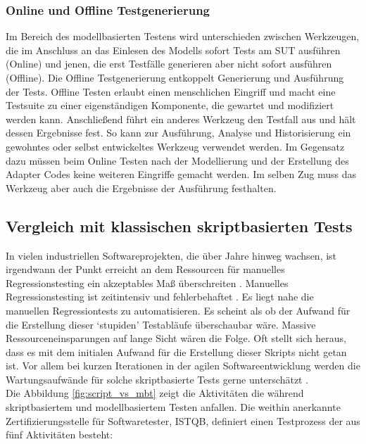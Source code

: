 \subsubsection{Online und Offline Testgenerierung}
\label{sec:online_offline}
Im Bereich des modellbasierten Testens wird unterschieden zwischen Werkzeugen, die im Anschluss an das Einlesen des Modells sofort Tests am \gls{SUT} ausführen (Online) und jenen, die erst Testfälle generieren aber nicht sofort ausführen (Offline). Die Offline Testgenerierung entkoppelt Generierung und Ausführung der Tests. Offline Testen erlaubt einen menschlichen Eingriff und macht eine Testsuite zu einer eigenständigen Komponente, die gewartet und modifiziert werden kann. Anschließend führt ein anderes Werkzeug den Testfall aus und hält dessen Ergebnisse fest. So kann zur Ausführung, Analyse und Historisierung ein gewohntes oder selbst entwickeltes Werkzeug verwendet werden. Im Gegensatz dazu müssen beim Online Testen nach der Modellierung und der Erstellung des Adapter Codes keine weiteren Eingriffe gemacht werden. Im selben Zug muss das Werkzeug aber auch die Ergebnisse der Ausführung festhalten.


\subsection{Vergleich mit klassischen skriptbasierten Tests}
In vielen industriellen Softwareprojekten, die über Jahre hinweg wachsen, ist irgendwann der Punkt erreicht an dem Ressourcen für manuelles Regressionstesting ein akzeptables Maß überschreiten \cite{graham_experiences_2012}. Manuelles Regressionstesting ist zeitintensiv und fehlerbehaftet \cite{utting_practical_2007}. Es liegt nahe die manuellen Regressiontests zu automatisieren. Es scheint als ob der Aufwand für die Erstellung dieser `stupiden' Testabläufe überschaubar wäre. Massive Ressourceneinsparungen auf lange Sicht wären die Folge. Oft stellt sich heraus, dass es mit dem initialen Aufwand für die Erstellung dieser Skripts nicht getan ist. Vor allem bei kurzen Iterationen in der agilen Softwareentwicklung werden die Wartungsaufwände für solche skriptbasierte Tests gerne unterschätzt \cite{graham_experiences_2012}.\\
Die Abbildung \ref{fig:script_vs_mbt} zeigt die Aktivitäten die während skriptbasiertem und modellbasiertem Testen anfallen. Die weithin anerkannte Zertifizierungsstelle für Softwaretester, \Gls{ISTQB}, definiert einen Testprozess \cite{spillner_basiswissen_2012} der aus fünf Aktivitäten besteht: 

